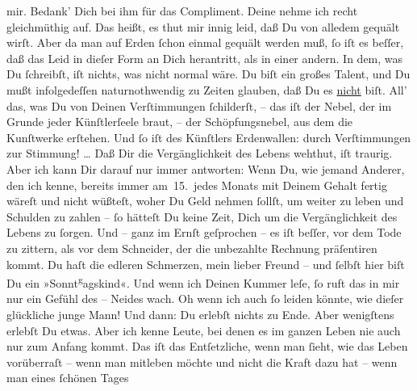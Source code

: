 \begin{ledgroupsized}[t]{13cm}
               mir. Bedank’ Dich bei ihm für das Compliment.\pend
           \pstart
           Deine \label{K_L02765-4v}\label{K_L02765-4h} nehme ich recht gleichmüthig auf. Das heißt, es thut mir innig leid, daß Du
               von alledem gequält wirſt. Aber da man auf  Erden ſchon einmal gequält werden muß, ſo iſt es beſſer, daß das Leid
               in dieſer Form an Dich herantritt, als in einer andern. In dem, was Du
               ſchreibſt, iſt nichts, was nicht normal wäre. Du biſt ein großes Talent, und Du mußt
               infolgedeſſen naturnothwendig zu Zeiten glauben, daß Du es \uline{nicht} biſt. All’ das, was Du von Deinen Verſtimmungen ſchilderſt, – das iſt
               der  Nebel, der im Grunde jeder Künſtlerſeele
               braut,  – der Schöpfungsnebel, aus dem die
               Kunſtwerke erſtehen. Und ſo iſt des Künſtlers Erdenwallen: durch Verſtimmungen zur
               Stimmung! {\dots} Daß Dir {\pb}die
               Vergänglichkeit des Lebens wehthut, iſt traurig. Aber ich kann Dir darauf nur immer
               antworten: Wenn Du, wie jemand Anderer, den ich kenne, bereits immer am 15. jedes
               Monats mit Deinem Gehalt fertig wäreſt und nicht wüßteſt, woher Du Geld nehmen
               ſollſt, um weiter zu leben und Schulden zu zahlen – ſo hätteſt Du keine Zeit, Dich um
               die Vergänglichkeit des Lebens zu ſorgen. Und – ganz im Ernſt geſprochen – es iſt
               beſſer, vor dem Tode zu zittern, als vor {\pb}dem
               Schneider, der die unbezahlte Rechnung präſentiren kommt. Du haſt die edleren
               Schmerzen, mein lieber Freund – und ſelbſt hier biſt Du ein »Sonnt\substVorne{}\textsuperscript{g}\substDazwischen{}a\substHinten{}gskind«. Und wenn ich Deinen Kummer leſe, ſo ruft das in mir nur ein Gefühl
               des – Neides wach. Oh wenn ich auch ſo  leiden
               könnte, wie dieſer glückliche junge Mann! Und dann: Du erlebſt nichts zu Ende. Aber
               wenigſtens erlebſt Du etwas. Aber ich kenne {\pb}Leute,
               bei  denen es im ganzen Leben nie auch nur zum
               Anfang kommt. Das iſt das Entſetzliche, wenn man ſieht, wie das Leben vorüberraſt –
               wenn man mitleben möchte und nicht die Kraft dazu hat – wenn man eines ſchönen Tages

\end{ledgroupsized}
